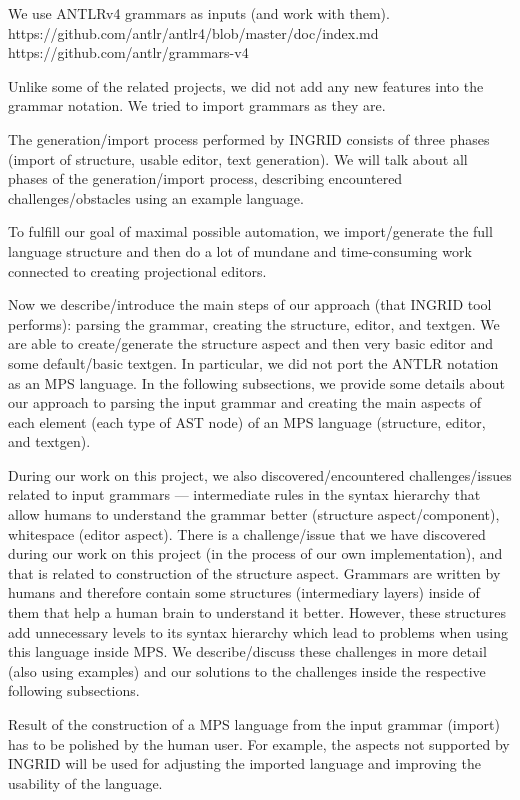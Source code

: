 \documentclass[10pt]{sigplanconf}
\begin{document}
We use ANTLRv4 grammars as inputs (and work with them).
	https://github.com/antlr/antlr4/blob/master/doc/index.md
	https://github.com/antlr/grammars-v4

Unlike some of the related projects, we did not add any new features into the grammar notation.
We tried to import grammars as they are.

The generation/import process performed by INGRID consists of three phases (import of structure, usable editor, text generation).
We will talk about all phases of the generation/import process, describing encountered challenges/obstacles using an example language.

To fulfill our goal of maximal possible automation, we import/generate the full language structure and then do a lot of mundane and time-consuming work connected to creating projectional editors.

Now we describe/introduce the main steps of our approach (that INGRID tool performs): parsing the grammar, creating the structure, editor, and textgen.
We are able to create/generate the structure aspect and then very basic editor and some default/basic textgen.
In particular, we did not port the ANTLR notation as an MPS language.
In the following subsections, we provide some details about our approach to parsing the input grammar and creating the main aspects of each element (each type of AST node) of an MPS language (structure, editor, and textgen).

During our work on this project, we also discovered/encountered challenges/issues related to input grammars --- intermediate rules in the syntax hierarchy that allow humans to understand the grammar better (structure aspect/component), whitespace (editor aspect).
There is a challenge/issue that we have discovered during our work on this project (in the process of our own implementation), and that is related to construction of the structure aspect.
Grammars are written by humans and therefore contain some structures (intermediary layers) inside of them that help a human brain to understand it better.
However, these structures add unnecessary levels to its syntax hierarchy which lead to problems when using this language inside MPS.
We describe/discuss these challenges in more detail (also using examples) and our solutions to the challenges inside the respective following subsections.

Result of the construction of a MPS language from the input grammar (import) has to be polished by the human user.
For example, the aspects not supported by INGRID will be used for adjusting the imported language and improving the usability of the language.
\end{document}
